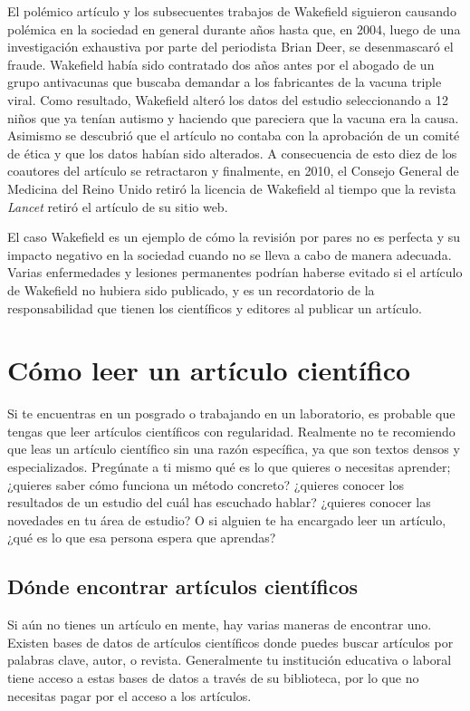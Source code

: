 El polémico artículo y los subsecuentes trabajos de Wakefield siguieron causando
polémica en la sociedad en general durante años hasta que, en 2004, luego de una
investigación exhaustiva por parte del periodista Brian Deer, se desenmascaró el
fraude\cite{Deerc1127}.
Wakefield había sido contratado dos años antes por el abogado de un grupo
antivacunas que buscaba demandar a los fabricantes de la vacuna triple viral.
Como resultado, Wakefield alteró los datos del estudio seleccionando a 12 niños
que ya tenían autismo y haciendo que pareciera que la vacuna era la causa.
Asimismo se descubrió que el artículo no contaba con la aprobación de un comité
de ética y que los datos habían sido alterados.
A consecuencia de esto diez de los coautores del artículo se retractaron y
finalmente, en 2010, el Consejo General de Medicina del Reino Unido retiró la
licencia de Wakefield al tiempo que la revista \emph{Lancet} retiró el artículo
de su sitio web.

El caso Wakefield es un ejemplo de cómo la revisión por pares no es perfecta y
su impacto negativo en la sociedad cuando no se lleva a cabo de manera
adecuada.
Varias enfermedades y lesiones permanentes podrían haberse evitado si el
artículo de Wakefield no hubiera sido publicado, y es un recordatorio de la
responsabilidad que tienen los científicos y editores al publicar un artículo.

\section{Cómo leer un artículo científico}
\label{sec:comoleer}

Si te encuentras en un posgrado o trabajando en un laboratorio, es probable que
tengas que leer artículos científicos con regularidad.
Realmente no te recomiendo que leas un artículo científico sin una razón
específica, ya que son textos densos y especializados.
Pregúnate a ti mismo qué es lo que quieres o necesitas aprender; ¿quieres saber
cómo funciona un método concreto? ¿quieres conocer los resultados de un estudio
del cuál has escuchado hablar? ¿quieres conocer las novedades en tu área de
estudio? O si alguien te ha encargado leer un artículo, ¿qué es lo que esa
persona espera que aprendas?

\subsection*{Dónde encontrar artículos científicos}
Si aún no tienes un artículo en mente, hay varias maneras de encontrar uno.
Existen bases de datos de artículos científicos donde puedes buscar artículos
por palabras clave, autor, o revista.
Generalmente tu institución educativa o laboral tiene acceso a estas bases de
datos a través de su biblioteca, por lo que no necesitas pagar por el acceso a
los artículos.

